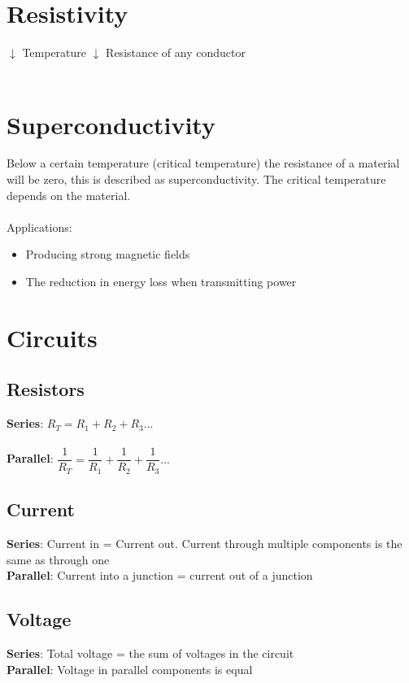 \documentclass{article}[18pt]
\begin{document}
\section{Resistivity}
$\downarrow$ Temperature $\downarrow$ Resistance of any conductor\\
\\
\section{Superconductivity}
Below a certain temperature (critical temperature) the resistance of a material will be zero, this is described as superconductivity. The critical temperature depends on the material.\\
\\
Applications:\\
\begin{itemize}
\item Producing strong magnetic fields
\item The reduction in energy loss when transmitting power
\end{itemize}
\section{Circuits}
\subsection{Resistors}
\textbf{Series}: $R_T=R_1+R_2+R_3...$\\
\\
\textbf{Parallel}: $\dfrac{1}{R_T}=\dfrac{1}{R_1}+\dfrac{1}{R_2}+\dfrac{1}{R_3}...$
\subsection{Current}
\textbf{Series}: Current in = Current out. Current through multiple components is the same as through one\\
\textbf{Parallel}: Current into a junction = current out of a junction
\subsection{Voltage}
\textbf{Series}: Total voltage = the sum of voltages in the circuit\\
\textbf{Parallel}: Voltage in parallel components is equal
\end{document}
